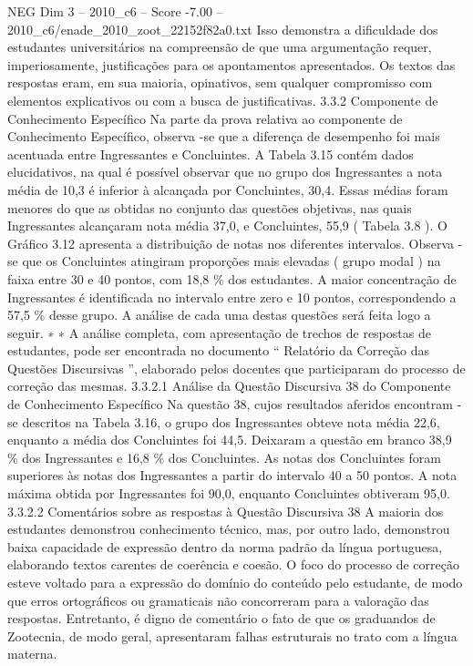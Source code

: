 \begin{textsample}{NEG Dim 3 – 2010\_c6 – Score -7.00 – 2010\_c6/enade\_2010\_zoot\_22152f82a0.txt}
Isso demonstra a dificuldade dos estudantes universitários na compreensão de que uma argumentação requer, imperiosamente, justificações para os apontamentos apresentados.
Os textos das respostas eram, em sua maioria, opinativos, sem qualquer compromisso com elementos explicativos ou com a busca de justificativas. 3.3.2 Componente de Conhecimento Específico Na parte da prova relativa ao componente de Conhecimento Específico, observa -se que a diferença de desempenho foi mais acentuada entre Ingressantes e Concluintes.
A Tabela 3.15 contém dados elucidativos, na qual é possível observar que no grupo dos Ingressantes a nota média de 10,3 é inferior à alcançada por Concluintes, 30,4.
Essas médias foram menores do que as obtidas no conjunto das questões objetivas, nas quais Ingressantes alcançaram nota média 37,0, e Concluintes, 55,9 ( Tabela 3.8 ).
O Gráfico 3.12 apresenta a distribuição de notas nos diferentes intervalos.
Observa -se que os Concluintes atingiram proporções mais elevadas ( grupo modal ) na faixa entre 30 e 40 pontos, com 18,8 \% dos estudantes.
A maior concentração de Ingressantes é identificada no intervalo entre zero e 10 pontos, correspondendo a 57,5 \% desse grupo.
A análise de cada uma destas questões será feita logo a seguir. ∗ ∗ A análise completa, com apresentação de trechos de respostas de estudantes, pode ser encontrada no documento “ Relatório da Correção das Questões Discursivas ”, elaborado pelos docentes que participaram do processo de correção das mesmas. 3.3.2.1 Análise da Questão Discursiva 38 do Componente de Conhecimento Específico Na questão 38, cujos resultados aferidos encontram -se descritos na Tabela 3.16, o grupo dos Ingressantes obteve nota média 22,6, enquanto a média dos Concluintes foi 44,5.
Deixaram a questão em branco 38,9 \% dos Ingressantes e 16,8 \% dos Concluintes.
As notas dos Concluintes foram superiores às notas dos Ingressantes a partir do intervalo 40 a 50 pontos.
A nota máxima obtida por Ingressantes foi 90,0, enquanto Concluintes obtiveram 95,0. 3.3.2.2 Comentários sobre as respostas à Questão Discursiva 38 A maioria dos estudantes demonstrou conhecimento técnico, mas, por outro lado, demonstrou baixa capacidade de expressão dentro da norma padrão da língua portuguesa, elaborando textos carentes de coerência e coesão.
O foco do processo de correção esteve voltado para a expressão do domínio do conteúdo pelo estudante, de modo que erros ortográficos ou gramaticais não concorreram para a valoração das respostas.
Entretanto, é digno de comentário o fato de que os graduandos de Zootecnia, de modo geral, apresentaram falhas estruturais no trato com a língua materna.

\end{textsample}

